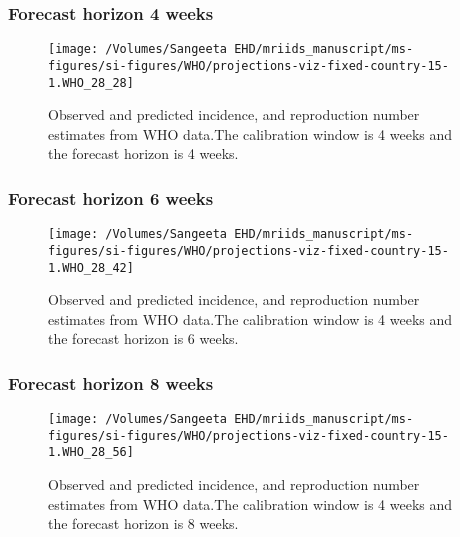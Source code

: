 \documentclass[11pt,]{article}
\begin{document}
\hypertarget{forecast-horizon-4-weeks-6}{%
  \subsubsection{Forecast horizon 4
    weeks}\label{forecast-horizon-4-weeks-6}}

\begin{figure}

  {\centering \texttt{[image: /Volumes/Sangeeta EHD/mriids\_manuscript/ms-figures/si-figures/WHO/projections-viz-fixed-country-15-1.WHO\_28\_28]} 

  }

  \caption{Observed and predicted incidence, and
    reproduction number estimates from WHO data.The calibration window
    is 4 weeks and the forecast horizon is 4 weeks.}
  \label{fig:who44}
\end{figure}

\hypertarget{forecast-horizon-6-weeks-7}{%
  \subsubsection{Forecast horizon 6 weeks}\label{forecast-horizon-6-weeks-7}}

\begin{figure}

  {
    \centering \texttt{[image: /Volumes/Sangeeta EHD/mriids\_manuscript/ms-figures/si-figures/WHO/projections-viz-fixed-country-15-1.WHO\_28\_42]} 

  }

  \caption{Observed and predicted incidence, and
    reproduction number estimates from WHO data.The calibration window
    is 4 weeks and the forecast horizon is 6 weeks.}
  \label{fig:who46}
\end{figure}

\hypertarget{forecast-horizon-8-weeks-7}{%
  \subsubsection{Forecast horizon 8 weeks}\label{forecast-horizon-8-weeks-7}}

\begin{figure}

  {\centering \texttt{[image: /Volumes/Sangeeta EHD/mriids\_manuscript/ms-figures/si-figures/WHO/projections-viz-fixed-country-15-1.WHO\_28\_56]} 

  }

  \caption{Observed and predicted incidence, and reproduction number estimates from WHO data.The calibration window is 4 weeks and the forecast horizon is 8 weeks.}\label{fig:SI-27}
\end{figure}
\end{document}
